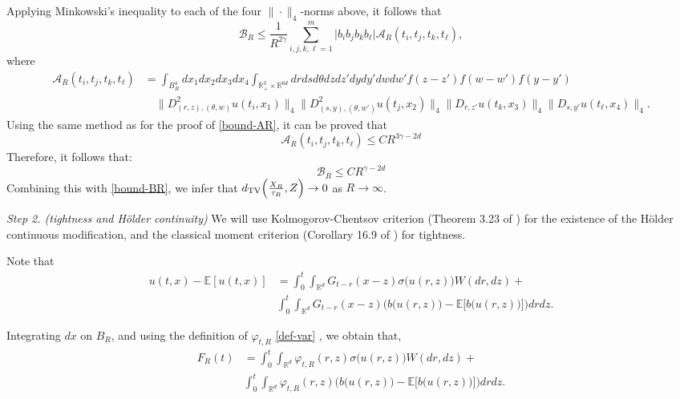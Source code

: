 \documentclass[12pt]{article}
\def\cA{\mathcal{A}}
\def\cB{\mathcal{B}}
\def\bE{\mathbb{E}}
\def\bR{\mathbb{R}}
\begin{document}
Applying Minkowski's inequality to each of the four $\|\cdot\|_4$-norms above, it follows that
\[
\cB_R \leq \frac{1}{R^{2\gamma}} \sum_{i,j,k,\ell=1}^{m} \big|b_i b_j b_k b_{\ell}\big| \cA_R(t_i,t_j,t_k,t_{\ell}), 
\]
where
\begin{align*}
\cA_R(t_i,t_j,t_k,t_{\ell}) &= \int_{B_R^4} dx_1 dx_2 dx_3 dx_4 \int_{\bR_+^3 \times \bR^{6d}}  dr ds d\theta  dzdz' dydy' dwdw'  f(z-z') f(w-w') f(y-y')  \\
&\quad   \| D_{(r,z),(\theta,w)}^2 u(t_i,x_1) \|_4  \| D_{(s,y),(\theta,w')}^2 u(t_j,x_2) \|_4  \| D_{r,z'} u(t_k,x_3)\|_4 \| D_{s, y'} u(t_{\ell},x_4) \|_4.
\end{align*}
Using the same method as for the proof of \eqref{bound-AR}, it can be proved that
\[
\cA_R(t_i,t_j,t_k,t_{\ell}) \leq C R^{3\gamma-2d}
\]
Therefore, it follows that:
\[
\cB_R \leq CR^{\gamma-2d}
\]
Combining this with \eqref{bound-BR}, we infer that $d_{\rm TV}\Big( \frac{X_R}{\tau_R},  Z\Big) \to 0$ as $R \to \infty$.

\medskip

{\em Step 2. (tightness and H\"older continuity)}  We  will use Kolmogorov-Chentsov criterion (Theorem 3.23 of \cite{kallenberg02}) for the existence of the H\"older continuous modification, and the classical moment criterion (Corollary 16.9 of \cite{kallenberg02}) for tightness.  

Note that
\begin{align*}
u(t,x)-\bE[u(t,x)]& =\int_0^t \int_{\bR^d} G_{t-r}(x-z) \sigma\big(u(r,z)\big) W(dr,dz)+\\
&\int_0^t \int_{\bR^d} G_{t-r}(x-z) \Big(b\big(u(r,z)\big) -\bE\big[b\big(u(r,z)\big) \big]\Big) drdz.
\end{align*}

Integrating $dx$ on $B_R$, and using the definition of $\varphi_{t,R}$ \eqref{def-var} , we obtain that,
\begin{align*}
F_R(t) & =\int_0^t \int_{\bR^d} \varphi_{t,R}(r,z) \sigma\big(u(r,z)\big) W(dr,dz)+\\
&\int_0^t \int_{\bR^d}  \varphi_{t,R}(r,z)  \Big(b\big(u(r,z)\big) -\bE\big[b\big(u(r,z)\big) \big]\Big) drdz.
\end{align*}
\end{document}
